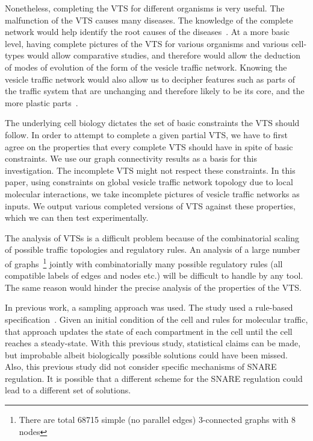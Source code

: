 Nonetheless, completing the VTS for different organisms is very useful. 
%
The malfunction of the VTS causes many diseases.
%
The knowledge of the complete network would help identify the root causes of
the diseases~\cite{bexiga2013human,gissen2007cargos}. 
%
At a more basic level, having complete pictures of the VTS for various organisms and various cell-types would allow comparative studies, and therefore would allow the deduction of modes of evolution of the form of the vesicle traffic network. 
%
Knowing the vesicle traffic network would also allow us to decipher features such as parts of the traffic system that are unchanging and therefore likely to be its core, and the more plastic parts~\cite{barlow2017seeing}.

%
The underlying cell biology dictates the set of basic constraints the VTS should follow.
%
In order to attempt to complete a given partial VTS, we have to first agree on the properties that every complete VTS should have in spite of basic constraints. 
%
We use our graph connectivity results as a basis for this investigation.   
%
The incomplete VTS might not respect these constraints. 
%
In this paper, using constraints on global vesicle traffic network topology due to local molecular interactions, we take incomplete pictures of vesicle traffic networks as inputs.
%
We output various completed versions of VTS against these properties, which we can then test experimentally.
%

The analysis of VTSs is a difficult problem because
of the combinatorial scaling of possible traffic topologies and
regulatory rules.
%
An analysis of a large number of graphs~\footnote{There are total 68715 simple (no parallel edges) 3-connected graphs with 8 nodes} jointly with combinatorially many possible regulatory rules (all compatible labels of edges and nodes etc.) will be difficult to handle by any tool.
%
The same reason would hinder the precise analysis of the properties of the VTS. 

In previous work, a sampling approach was used. 
%
The study used a rule-based specification~\cite{mani2016stacking}.
Given an initial condition of the cell and rules for molecular traffic,
that approach updates the state of each compartment in the cell until the cell reaches a steady-state. 
%
With this previous study, statistical claims can be made, but improbable albeit biologically possible solutions could have been missed.
%
Also, this previous study did not consider specific mechanisms of SNARE regulation. 
%
It is possible that a different scheme for the SNARE regulation could lead to a different set of solutions.

